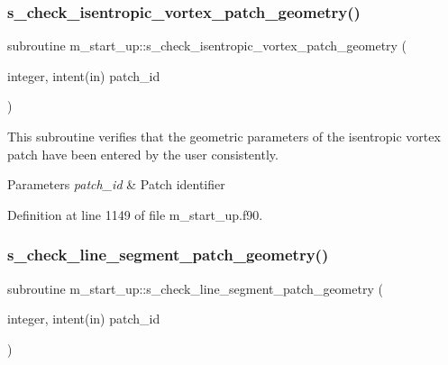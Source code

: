 \mbox{\label{namespacem__start__up_a3fe683c4126d72deba7f8daf1ad83b94}} 
\subsubsection{\texorpdfstring{s\+\_\+check\+\_\+isentropic\+\_\+vortex\+\_\+patch\+\_\+geometry()}{s\_check\_isentropic\_vortex\_patch\_geometry()}}
{\footnotesize\ttfamily subroutine m\+\_\+start\+\_\+up\+::s\+\_\+check\+\_\+isentropic\+\_\+vortex\+\_\+patch\+\_\+geometry (\begin{DoxyParamCaption}\item[{integer, intent(in)}]{patch\+\_\+id }\end{DoxyParamCaption})}



This subroutine verifies that the geometric parameters of the isentropic vortex patch have been entered by the user consistently. 


\begin{DoxyParams}{Parameters}
{\em patch\+\_\+id} & Patch identifier \\
\hline
\end{DoxyParams}


Definition at line 1149 of file m\+\_\+start\+\_\+up.\+f90.

\mbox{\label{namespacem__start__up_a9a3e975da11ddbbabdf66a66ff9167d1}} 
\subsubsection{\texorpdfstring{s\+\_\+check\+\_\+line\+\_\+segment\+\_\+patch\+\_\+geometry()}{s\_check\_line\_segment\_patch\_geometry()}}
{\footnotesize\ttfamily subroutine m\+\_\+start\+\_\+up\+::s\+\_\+check\+\_\+line\+\_\+segment\+\_\+patch\+\_\+geometry (\begin{DoxyParamCaption}\item[{integer, intent(in)}]{patch\+\_\+id }\end{DoxyParamCaption})}



